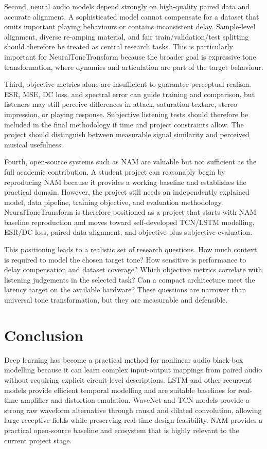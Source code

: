 \documentclass[conference]{IEEEtran}
\begin{document}
Second, neural audio models depend strongly on high-quality paired data and accurate alignment. A sophisticated model cannot compensate for a dataset that omits important playing behaviours or contains inconsistent delay. Sample-level alignment, diverse re-amping material, and fair train/validation/test splitting should therefore be treated as central research tasks. This is particularly important for NeuralToneTransform because the broader goal is expressive tone transformation, where dynamics and articulation are part of the target behaviour.

Third, objective metrics alone are insufficient to guarantee perceptual realism. ESR, MSE, DC loss, and spectral error can guide training and comparison, but listeners may still perceive differences in attack, saturation texture, stereo impression, or playing response. Subjective listening tests should therefore be included in the final methodology if time and project constraints allow. The project should distinguish between measurable signal similarity and perceived musical usefulness.

Fourth, open-source systems such as NAM are valuable but not sufficient as the full academic contribution. A student project can reasonably begin by reproducing NAM because it provides a working baseline and establishes the practical domain. However, the project still needs an independently explained model, data pipeline, training objective, and evaluation methodology. NeuralToneTransform is therefore positioned as a project that starts with NAM baseline reproduction and moves toward self-developed TCN/LSTM modelling, ESR/DC loss, paired-data alignment, and objective plus subjective evaluation.

This positioning leads to a realistic set of research questions. How much context is required to model the chosen target tone? How sensitive is performance to delay compensation and dataset coverage? Which objective metrics correlate with listening judgements in the selected task? Can a compact architecture meet the latency target on the available hardware? These questions are narrower than universal tone transformation, but they are measurable and defensible.

\section{Conclusion}

Deep learning has become a practical method for nonlinear audio black-box modelling because it can learn complex input-output mappings from paired audio without requiring explicit circuit-level descriptions. LSTM and other recurrent models provide efficient temporal modelling and are suitable baselines for real-time amplifier and distortion emulation. WaveNet and TCN models provide a strong raw waveform alternative through causal and dilated convolution, allowing large receptive fields while preserving real-time design feasibility. NAM provides a practical open-source baseline and ecosystem that is highly relevant to the current project stage.
\end{document}
